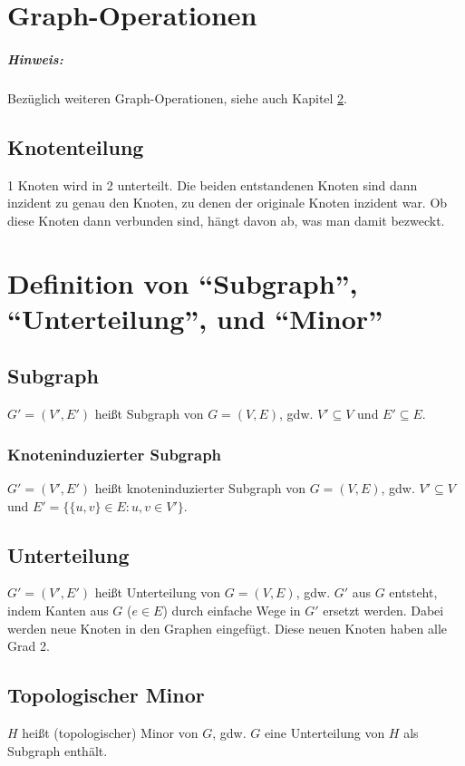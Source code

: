 \documentclass[a4paper,11pt]{report}
\begin{document}
\chapter{Graph-Operationen}
\paragraph{Hinweis:} Bezüglich weiteren Graph-Operationen, siehe auch Kapitel \ref{ch:DefVonSubgrUntertMinor}.


\section{Knotenteilung}
1 Knoten wird in 2 unterteilt. Die beiden entstandenen Knoten sind dann inzident zu genau den Knoten, zu denen der originale Knoten inzident war. Ob diese Knoten dann verbunden sind, hängt davon ab, was man damit bezweckt.


\chapter{Definition von ``Subgraph'', ``Unterteilung'', und ``Minor''}
\label{ch:DefVonSubgrUntertMinor}
\section{Subgraph}
$G' = (V', E')$ heißt Subgraph von $G = (V, E)$, gdw. $V' \subseteq V$ und $E' \subseteq E$.


\subsection{Knoteninduzierter Subgraph}
$G' = (V', E')$ heißt knoteninduzierter Subgraph von $G = (V, E)$, gdw. $V' \subseteq V$ und $E' = \{ \{u, v\} \in E : u, v \in V' \}$.


\section{Unterteilung}
$G' = (V', E')$ heißt Unterteilung von $G = (V, E)$, gdw. $G'$ aus $G$ entsteht, indem Kanten aus $G$ ($e \in E$) durch einfache Wege in $G'$ ersetzt werden. Dabei werden neue Knoten in den Graphen eingefügt. Diese neuen Knoten haben alle Grad 2.


\section{Topologischer Minor}
$H$ heißt (topologischer) Minor von $G$, gdw. $G$ eine Unterteilung von $H$ als Subgraph enthält.
\end{document}

